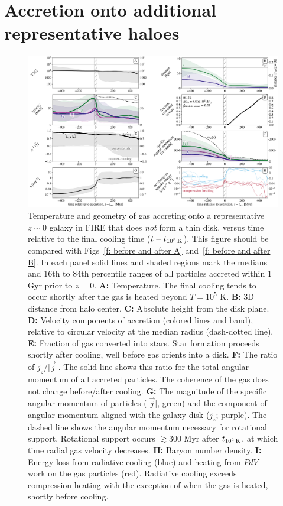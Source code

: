 \documentclass[fleqn,usenatbib]{mnras}
\newcommand{\tcools}{t_{10^5\,{\rm K}}}
\begin{document}
\section{Accretion onto additional representative haloes}
\label{s: appendix-more before and after}

\begin{figure}\includegraphics[width=\textwidth]{figures/variations/relative_to_accretion/before_and_after/before_and_after_allone_m11d_md.pdf}
\caption{
Temperature and geometry of gas accreting onto a representative $z\sim0$ galaxy in FIRE that does \textit{not} form a thin disk, versus time relative to the final cooling time ($t - \tcools$).
This figure should be compared with Figs~\ref{f: before and after A} and~\ref{f: before and after B}.
In each panel solid lines and shaded regions mark the medians and 16th to 84th percentile ranges of all particles accreted within 1 Gyr prior to $z=0$.
\textbf{A:} Temperature.
The final cooling tends to occur shortly after the gas is heated beyond $T=10^5$ K.
\textbf{B:} 3D distance from halo center.
\textbf{C:} Absolute height from the disk plane.
\textbf{D:} Velocity components of accretion (colored lines and band), relative to circular velocity at the median radius (dash-dotted line).
\textbf{E:} Fraction of gas converted into stars.
Star formation proceeds shortly after cooling, well before gas orients into a disk.
\textbf{F:} The ratio of $j_z / \vert \vec j \vert$.
The solid line shows this ratio for the total angular momentum of all accreted particles.
The coherence of the gas does not change before/after cooling.
\textbf{G:} The magnitude of the specific angular momentum of particles ($\vert\vec{j}\vert$, green) and the component of angular momentum aligned with the galaxy disk ($j_z$; purple).
The dashed line shows the angular momentum necessary for rotational support.
Rotational support occurs $\gtrsim 300$ Myr after $\tcools$, at which time radial gas velocity decreases.
\textbf{H:} Baryon number density.
\textbf{I:} Energy loss from radiative cooling (blue) and heating from $PdV$ work on the gas particles (red).
Radiative cooling exceeds compression heating with the exception of when the gas is heated, shortly before cooling.
}
\label{f: counterexample}
\end{figure}
\end{document}
